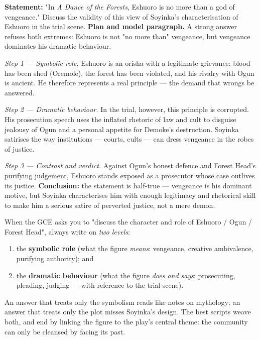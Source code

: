 \documentclass[11pt]{article}
\begin{document}
\begin{exoresolu}
\textbf{Statement:} "In \emph{A Dance of the Forests}, Eshuoro is no more than a god of vengeance." Discuss the validity of this view of Soyinka's characterisation of Eshuoro in the trial scene.
\tcblower
\textbf{Plan and model paragraph.} A strong answer refuses both extremes: Eshuoro is not "no more than" vengeance, but vengeance dominates his dramatic behaviour.

\emph{Step 1 — Symbolic role.} Eshuoro is an orisha with a legitimate grievance: blood has been shed (Oremole), the forest has been violated, and his rivalry with Ogun is ancient. He therefore represents a real principle — the demand that wrongs be answered.

\emph{Step 2 — Dramatic behaviour.} In the trial, however, this principle is corrupted. His prosecution speech uses the inflated rhetoric of law and cult to disguise jealousy of Ogun and a personal appetite for Demoke's destruction. Soyinka satirises the way institutions — courts, cults — can dress vengeance in the robes of justice.

\emph{Step 3 — Contrast and verdict.} Against Ogun's honest defence and Forest Head's purifying judgement, Eshuoro stands exposed as a prosecutor whose case outlives its justice. \textbf{Conclusion:} the statement is half-true — vengeance is his dominant motive, but Soyinka characterises him with enough legitimacy and rhetorical skill to make him a serious satire of perverted justice, not a mere demon.
\end{exoresolu}

\begin{exemplebox}
When the GCE asks you to "discuss the character and role of Eshuoro / Ogun / Forest Head", always write on \emph{two levels}:
\begin{enumerate}
\item the \textbf{symbolic role} (what the figure \emph{means}: vengeance, creative ambivalence, purifying authority); and
\item the \textbf{dramatic behaviour} (what the figure \emph{does and says}: prosecuting, pleading, judging — with reference to the trial scene).
\end{enumerate}
An answer that treats only the symbolism reads like notes on mythology; an answer that treats only the plot misses Soyinka's design. The best scripts weave both, and end by linking the figure to the play's central theme: the community can only be cleansed by facing its past.
\end{exemplebox}
\end{document}
